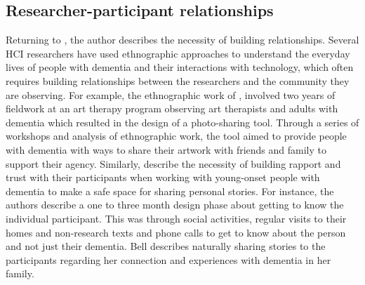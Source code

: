 \subsection{Researcher-participant relationships}
\label{BL:Trust}
Returning to \cite{lindsay_empathy_2012}, the author describes the necessity of building relationships. Several HCI researchers have used ethnographic approaches to understand the everyday lives of people with dementia and their interactions with technology, which often requires building relationships between the researchers and the community they are observing. For example, the ethnographic work of \cite{lazar_supporting_2017}, involved two years of fieldwork at an art therapy program observing art therapists and adults with dementia which resulted in the design of a photo-sharing tool. Through a series of workshops and analysis of ethnographic work, the tool aimed to provide people with dementia with ways to share their artwork with friends and family to support their agency. Similarly, \cite{bell2019collaborative} describe the necessity of building rapport and trust with their participants when working with young-onset people with dementia to make a safe space for sharing personal stories. For instance, the authors describe a one to three month design phase about getting to know the individual participant. This was through social activities, regular visits to their homes and non-research texts and phone calls to get to know about the person and not just their dementia. Bell describes naturally sharing stories to the participants regarding her connection and experiences with dementia in her family. 

